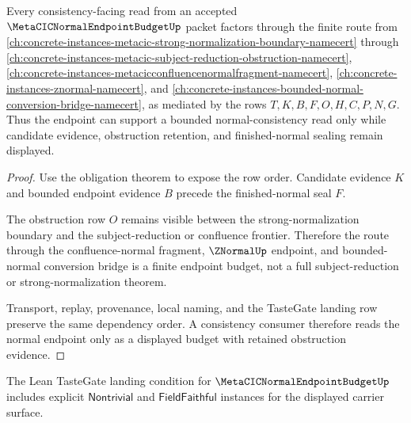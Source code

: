 \begin{theorem}
\label{thm:metacic-normal-endpoint-budget-consistency-boundary}
Every consistency-facing read from an accepted $\MetaCICNormalEndpointBudgetUp$ packet factors through the finite route from \autoref{ch:concrete-instances-metacic-strong-normalization-boundary-namecert} through \autoref{ch:concrete-instances-metacic-subject-reduction-obstruction-namecert}, \autoref{ch:concrete-instances-metacicconfluencenormalfragment-namecert}, \autoref{ch:concrete-instances-znormal-namecert}, and \autoref{ch:concrete-instances-bounded-normal-conversion-bridge-namecert}, as mediated by the rows $T,K,B,F,O,H,C,P,N,G$. Thus the endpoint can support a bounded normal-consistency read only while candidate evidence, obstruction retention, and finished-normal sealing remain displayed.
\end{theorem}
\begin{proof}
Use the obligation theorem to expose the row order. Candidate evidence $K$ and bounded endpoint evidence $B$ precede the finished-normal seal $F$.

The obstruction row $O$ remains visible between the strong-normalization boundary and the subject-reduction or confluence frontier. Therefore the route through the confluence-normal fragment, $\ZNormalUp$ endpoint, and bounded-normal conversion bridge is a finite endpoint budget, not a full subject-reduction or strong-normalization theorem.

Transport, replay, provenance, local naming, and the TasteGate landing row preserve the same dependency order. A consistency consumer therefore reads the normal endpoint only as a displayed budget with retained obstruction evidence.
\end{proof}



The Lean TasteGate landing condition for $\MetaCICNormalEndpointBudgetUp$ includes explicit $\mathsf{Nontrivial}$ and $\mathsf{FieldFaithful}$ instances for the displayed carrier surface.

